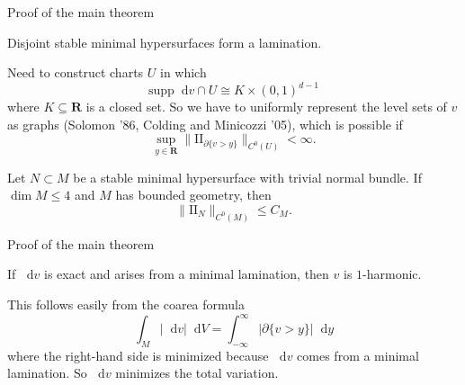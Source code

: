 \documentclass[10pt]{beamer}
\newcommand{\RR}{\mathbf{R}}
\newcommand*\dif{\mathop{}\!\mathrm{d}}
\newcommand{\Two}{\mathrm{I\!I}}
\begin{document}
\begin{frame}{Proof of the main theorem}
\begin{lemma}
Disjoint stable minimal hypersurfaces form a lamination.
\end{lemma}
    
Need to construct charts $U$ in which 
$$\mathrm{supp} \dif v \cap U \cong K \times (0, 1)^{d - 1}$$
where $K \subseteq \RR$ is a closed set.
So we have to uniformly represent the level sets of $v$ as graphs (Solomon '86, Colding and Minicozzi '05), which is possible if
$$\sup_{y \in \RR} \|\Two_{\partial \{v > y\}}\|_{C^0(U)} < \infty.$$ \pause

\begin{theorem}
Let $N \subset M$ be a stable minimal hypersurface with trivial normal bundle.
If $\dim M \leq 4$ and $M$ has bounded geometry, then
$$\|\Two_N\|_{C^0(M)} \leq C_M.$$
\end{theorem}
\end{frame}




\begin{frame}{Proof of the main theorem}
\begin{lemma}
If $\dif v$ is exact and arises from a minimal lamination, then $v$ is $1$-harmonic.
\end{lemma}

This follows easily from the coarea formula 
$$\int_M |\dif v| \dif V = \int_{-\infty}^\infty |\partial \{v > y\}| \dif y$$
where the right-hand side is minimized because $\dif v$ comes from a minimal lamination.
So $\dif v$ minimizes the total variation.
\end{frame}
\end{document}

